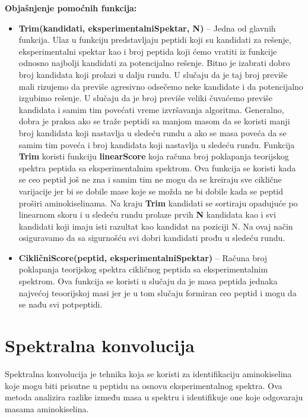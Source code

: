 \documentclass[12pt,oneside]{memoir}
\begin{document}
\noindent
\textbf{Objašnjenje pomoćnih funkcija:}
\begin{itemize}
    \item \textbf{Trim(kandidati, eksperimentalniSpektar, N)} – Jedna od glavnih funkcija. Ulaz u funkciju predstavljaju peptidi koji su kandidati za rešenje, eksperimentalni spektar kao i broj peptida koji ćemo vratiti iz funkcije odnosno najbolji kandidati za potencijalno rešenje. Bitno je izabrati dobro broj kandidata koji prolazi u dalju rundu. U slučaju da je taj broj previše mali rizujemo da previše agresivno odsečemo neke kandidate i da potencijalno izgubimo rešenje. U slučaju da je broj previše veliki čuvaćemo previše kandidata i samim tim povećati vreme izvršavanja algoritma. Generalno, dobra je praksa ako se traže peptidi sa manjom masom da se koristi manji broj kandidata koji nastavlja u sledeću rundu a ako se masa poveća da se samim tim poveća i broj kandidata koji nastavlja u sledeću rundu. Funkcija \textbf{Trim} koristi funkciju \textbf{linearScore} koja računa broj poklapanja teorijskog spektra peptida sa eksperimentalnim spektrom. Ova funkcija se koristi kada se ceo peptid još ne zna i samim tim ne mogu da se kreiraju sve ciklične varijacije jer bi se dobile mase koje se možda ne bi dobile kada se peptid proširi aminokiselinama. Na kraju \textbf{Trim} kandidati se sortiraju opadujuće po linearnom skoru i u sledeću rundu prolaze prvih \textbf{N} kandidata kao i svi kandidati koji imaju isti razultat kao kandidat na poziciji N. Na ovaj način osiguravamo da sa sigurnošću svi dobri kandidati prođu u sledeću rundu.
    \item \textbf{CikličniScore(peptid, eksperimentalniSpektar)} – Računa broj poklapanja teorijskog spektra cikličnog peptida sa eksperimentalnim spektrom. Ova funkcija se koristi u slučaju da je masa peptida jednaka najvećoj teoorijskoj masi jer je u tom slučaju formiran ceo peptid i mogu da se nađu svi potpeptidi.
\end{itemize}

\section{Spektralna konvolucija}

Spektralna konvolucija \cite{online_lecture, online_book} je tehnika koja se koristi za identifikaciju aminokiselina koje mogu biti prisutne u peptidu na osnovu eksperimentalnog spektra. Ova metoda analizira razlike između masa u spektru i identifikuje one koje odgovaraju masama aminokiselina.
\end{document}
